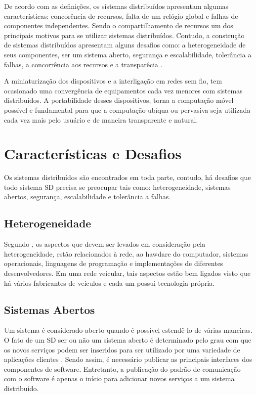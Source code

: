 \documentclass[
	12pt,				%
	oneside,			%
	a4paper,			%
	english,			%
	brazil				%
	]{abntex2ppgsi}
\begin{document}
De acordo com as definições, os sistemas distribuídos apresentam algumas características: concorência de recursos,  falta de um relógio global e falhas de componentes independentes. Sendo o compartilhamento de recursos um dos principais motivos para se utilizar sistemas distribuídos. Contudo, a construção de sistemas distribuídos apresentam alguns desafios como:  a heterogeneidade de seus componentes, ser um sistema aberto, segurança e escalabilidade, tolerância a falhas, a concorrência aos recursos e a transparêcia \cite{coulouris2013sistemas}.

A miniaturização dos dispositivos  e a interligação em redes sem fio, tem ocasionado uma convergência de equipamentos cada vez menores com sistemas distribuídos. A portabilidade desses dispositivos, torna a computação móvel possível e fundamental para que a computação ubíqua ou pervasiva seja utilizada cada vez mais pelo usuário e de maneira transparente e natural.

\section{Características e Desafios}

Os sistemas distribuídos são encontrados em toda parte, contudo, há desafios que todo sistema SD precisa se preocupar tais como: heterogeneidade, sistemas abertos,  segurança, escalabilidade e tolerância a falhas.

\subsection{Heterogeneidade}

Segundo , os aspectos que devem ser levados em consideração pela heterogeneidade, estão relacionados à rede, ao hawdare do computador, sistemas operacionais, linguagens de programação e implementações de diferentes desenvolvedores. Em uma rede veicular, tais aspectos estão bem ligados visto que há vários fabricantes de veículos e cada um possui tecnologia própria.

\subsection{Sistemas Abertos}

Um sistema é considerado aberto quando é possível estendê-lo de várias maneiras. O fato de um SD ser ou não um sistema aberto é determinado pelo grau com que os novos serviços podem ser inseridos para ser utilizado por uma variedade de aplicações clientes \cite{coulouris2013sistemas}. Sendo assim, é necessário publicar as principais interfaces dos componentes de software. Entretanto, a publicação do padrão de comunicação com o software é apenas o início para adicionar novos serviços a um sistema distribuído.
\end{document}
